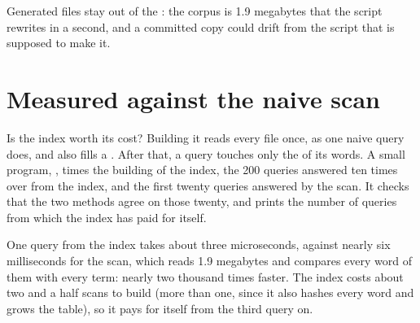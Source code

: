 \label{out:b1:project-text-search-engine:history}

Generated files stay out of the : the corpus is 1.9 megabytes that the script rewrites in a second, and a
committed copy could drift from the script that is supposed to make it.

\section{Measured against the naive scan}\label{sec:b1:project-text-search-engine:measure}

Is the index worth its cost? Building it reads every file once, as one naive query does, and also fills a .
After that, a query touches only the  of its words. A small program, , times the building of
the index, the 200 queries answered ten times over from the index, and the first twenty queries answered by the scan.
It checks that the two methods agree on those twenty, and prints the number of queries from which the index has paid
for itself.

\label{out:b1:project-text-search-engine:timing}

One query from the index takes about three microseconds, against nearly six milliseconds for the scan, which reads
1.9 megabytes and compares every word of them with every term: nearly two thousand times faster. The index costs about
two and a half scans to build (more than one, since it also hashes every word and grows the table), so it pays for itself from the
third query on.

